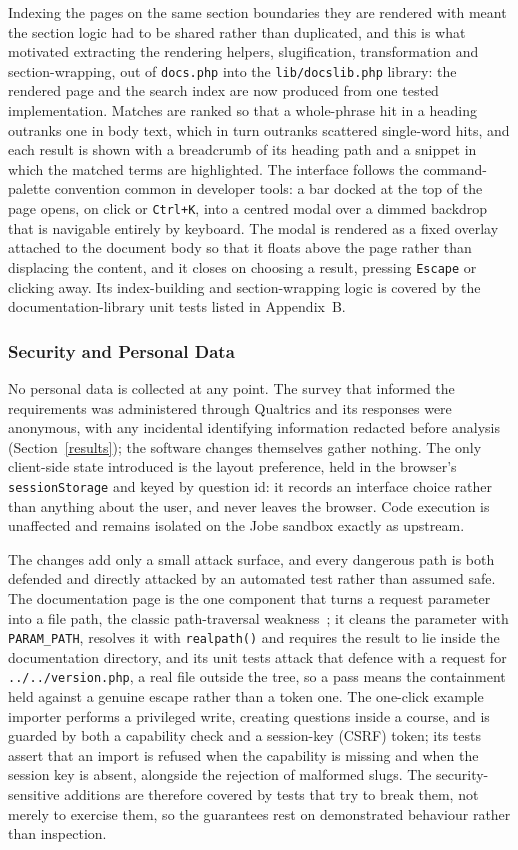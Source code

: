 Indexing the pages on the same section boundaries they are rendered with meant the section logic had to be shared rather than duplicated, and this is what motivated extracting the rendering helpers, slugification, transformation and section-wrapping, out of \texttt{docs.php} into the \texttt{lib/docslib.php} library: the rendered page and the search index are now produced from one tested implementation. Matches are ranked so that a whole-phrase hit in a heading outranks one in body text, which in turn outranks scattered single-word hits, and each result is shown with a breadcrumb of its heading path and a snippet in which the matched terms are highlighted. The interface follows the command-palette convention common in developer tools: a bar docked at the top of the page opens, on click or \texttt{Ctrl+K}, into a centred modal over a dimmed backdrop that is navigable entirely by keyboard. The modal is rendered as a fixed overlay attached to the document body so that it floats above the page rather than displacing the content, and it closes on choosing a result, pressing \texttt{Escape} or clicking away. Its index-building and section-wrapping logic is covered by the documentation-library unit tests listed in Appendix~B.

\subsubsection{Security and Personal Data}
No personal data is collected at any point. The survey that informed the requirements was administered through Qualtrics and its responses were anonymous, with any incidental identifying information redacted before analysis (Section~\ref{results}); the software changes themselves gather nothing. The only client-side state introduced is the layout preference, held in the browser's \texttt{sessionStorage} and keyed by question id: it records an interface choice rather than anything about the user, and never leaves the browser. Code execution is unaffected and remains isolated on the Jobe sandbox exactly as upstream.

The changes add only a small attack surface, and every dangerous path is both defended and directly attacked by an automated test rather than assumed safe. The documentation page is the one component that turns a request parameter into a file path, the classic path-traversal weakness~\cite{cwe22}; it cleans the parameter with \texttt{PARAM\_PATH}, resolves it with \texttt{realpath()} and requires the result to lie inside the documentation directory, and its unit tests attack that defence with a request for \texttt{../../version.php}, a real file outside the tree, so a pass means the containment held against a genuine escape rather than a token one. The one-click example importer performs a privileged write, creating questions inside a course, and is guarded by both a capability check and a session-key (CSRF) token; its tests assert that an import is refused when the capability is missing and when the session key is absent, alongside the rejection of malformed slugs. The security-sensitive additions are therefore covered by tests that try to break them, not merely to exercise them, so the guarantees rest on demonstrated behaviour rather than inspection.

